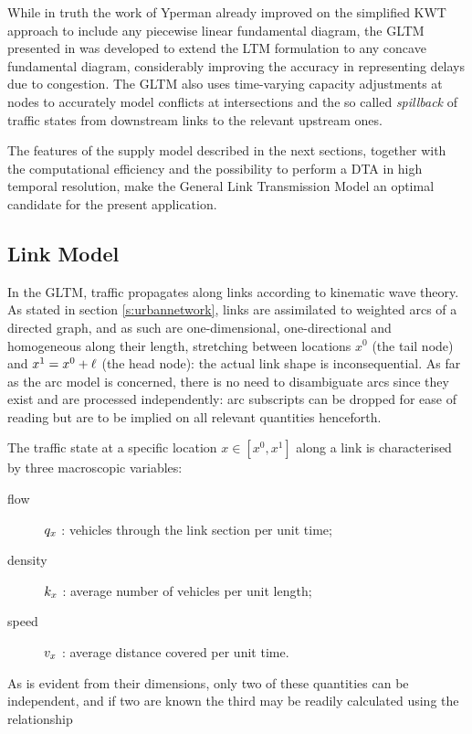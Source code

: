 While in truth the work of Yperman already improved on the simplified KWT approach to include any piecewise linear fundamental diagram, the GLTM presented in \cite{gentile2010general} was developed to extend the LTM formulation to any concave fundamental diagram, considerably improving the accuracy in representing delays due to congestion. The GLTM also uses time-varying capacity adjustments at nodes to accurately model conflicts at intersections and the so called \emph{spillback} of traffic states from downstream links to the relevant upstream ones.

The features of the supply model described in the next sections, together with the computational efficiency and the possibility to perform a DTA in high temporal resolution, make the General Link Transmission Model an optimal candidate for the present application.


\subsection{Link Model}
In the GLTM, traffic propagates along links according to kinematic wave theory.
As stated in section \ref{s:urbannetwork}, links are assimilated to weighted arcs of a directed graph, and as such are one-dimensional, one-directional and homogeneous along their length, stretching between locations $x^0$ (the tail node) and $x^1 = x^0 + \ell$ (the head node): the actual link shape is inconsequential. As far as the arc model is concerned, there is no need to disambiguate arcs since they exist and are processed independently: arc subscripts can be dropped for ease of reading but are to be implied on all relevant quantities henceforth.

The traffic state at a specific location $x \in \left[x^0, x^1\right]$ along a link is characterised by three macroscopic variables:
\begin{description}
\item[flow] $q_x$ : vehicles through the link section per unit time;
\item[density] $k_x$ : average number of vehicles per unit length;
\item[speed] $v_x$ : average distance covered per unit time.
\end{description}
As is evident from their dimensions, only two of these quantities can be independent, and if two are known the third may be readily calculated using the relationship

